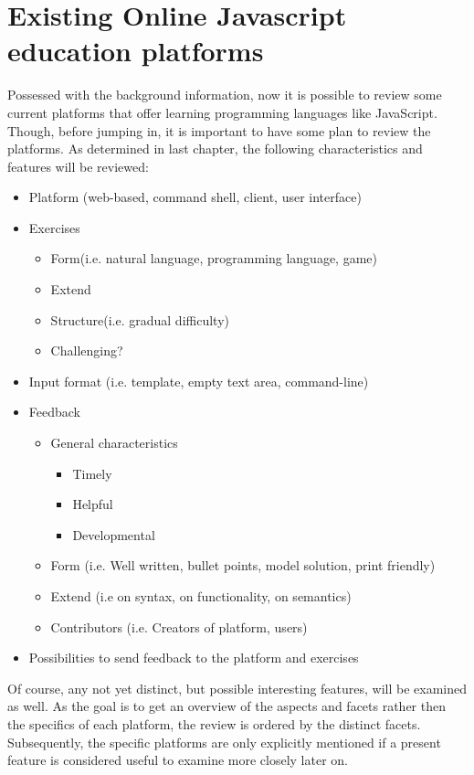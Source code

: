 \documentclass{article}
\begin{document}
\section{Existing Online Javascript education platforms} 
Possessed with the background information, now it is possible to
review some current platforms that offer learning programming languages like 
JavaScript. Though, before jumping in, it is important to have some plan to
review the platforms. As determined in last chapter, the following 
characteristics and features will be reviewed:
\begin{itemize}
  \item Platform (web-based, command shell, client, user interface)
  \item Exercises
    \begin{itemize}
      \item Form(i.e. natural language, programming language, game)
	  \item Extend
	  \item Structure(i.e. gradual difficulty)
	  \item Challenging?
    \end{itemize}
  \item Input format (i.e. template, empty text area, command-line)
  \item Feedback
    \begin{itemize}
	  \item General characteristics
	    \begin{itemize}
          \item Timely
	      \item Helpful
	      \item Developmental
        \end{itemize}
	  \item Form (i.e. Well written, bullet points, model solution, print friendly)
	  \item Extend (i.e on syntax, on functionality, on semantics)
	  \item Contributors (i.e. Creators of platform, users)
	\end{itemize}
  \item Possibilities to send feedback to the platform and exercises
\end{itemize}

Of course, any not yet distinct, but possible interesting features, 
will be examined as well. As the goal is to get an overview of the aspects and
facets rather then the specifics of each platform, the review is ordered by 
the distinct facets. Subsequently, the specific platforms are only
explicitly mentioned if
a present feature is considered useful to examine more closely later on.
\end{document}
